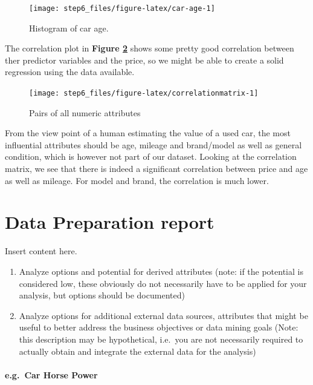 \documentclass[sigchi]{acmart}
\def\tightlist{}
\begin{document}
\begin{figure}
\texttt{[image: step6\_files/figure-latex/car-age-1]} \caption{Histogram of car age.}\label{fig:car-age}
\end{figure}

The correlation plot in \textbf{Figure \ref{fig:correlationmatrix}} shows some pretty good correlation between ther predictor variables and the price, so we might be able to create a solid regression using the data available.

\begin{figure}
\texttt{[image: step6\_files/figure-latex/correlationmatrix-1]} \caption{Pairs of all numeric attributes}\label{fig:correlationmatrix}
\end{figure}

From the view point of a human estimating the value of a used car, the most influential attributes should be age, mileage and brand/model as well as general condition, which is however not part of our dataset. Looking at the correlation matrix, we see that there is indeed a significant correlation between price and age as well as mileage. For model and brand, the correlation is much lower.

\hypertarget{data-preparation-report}{%
\section{Data Preparation report}\label{data-preparation-report}}

Insert content here.

\begin{enumerate}
\def\labelenumi{\alph{enumi}.}
\tightlist
\item
  Analyze options and potential for derived attributes (note: if the potential is considered low, these obviously do not necessarily have to be applied for your analysis, but options should be documented)
\item
  Analyze options for additional external data sources, attributes that might be useful to better address the business objectives or data mining goals (Note: this description may be hypothetical, i.e.~you are not necessarily required to actually obtain and integrate the external data for the analysis)
\end{enumerate}

\hypertarget{e.g.-car-horse-power}{%
\paragraph{e.g.~Car Horse Power}\label{e.g.-car-horse-power}}
\end{document}
